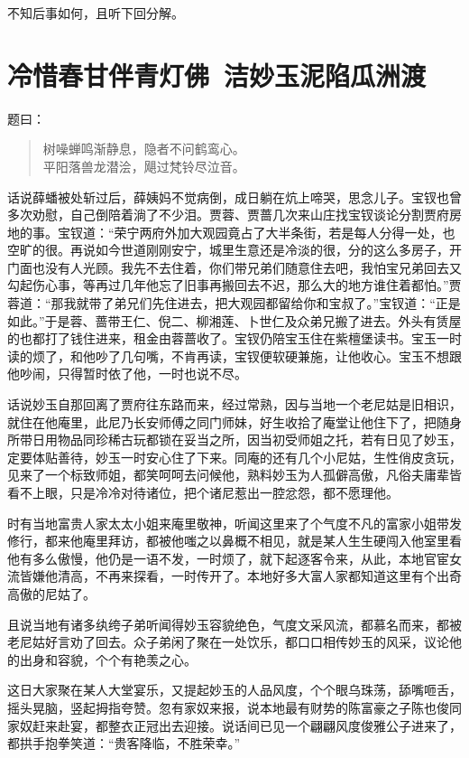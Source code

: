 \documentclass[12pt,oneside]{book}
\newenvironment{shici}{%
\begin{verse}%
\centering\large\hspace{12pt}}%
{\end{verse}}
\begin{document}
不知后事如何，且听下回分解。

 
\chapter{冷惜春甘伴青灯佛~洁妙玉泥陷瓜洲渡}
题曰：

\begin{shici}
树噪蝉鸣渐静息，隐者不问鹤鸾心。\\
平阳落兽龙潜浍，飓过梵铃尽泣音。
\end{shici}


话说薛蟠被处斩过后，薛姨妈不觉病倒，成日躺在炕上啼哭，思念儿子。宝钗也曾多次劝慰，自己倒陪着淌了不少泪。贾蓉、贾蔷几次来山庄找宝钗谈论分割贾府房地的事。宝钗道：“荣宁两府外加大观园竟占了大半条街，若是每人分得一处，也空旷的很。再说如今世道刚刚安宁，城里生意还是冷淡的很，分的这么多房子，开门面也没有人光顾。我先不去住着，你们带兄弟们随意住去吧，我怕宝兄弟回去又勾起伤心事，等再过几年他忘了旧事再搬回去不迟，那么大的地方谁住着都怕。”贾蓉道：“那我就带了弟兄们先住进去，把大观园都留给你和宝叔了。”宝钗道：“正是如此。”于是蓉、蔷带王仁、倪二、柳湘莲、卜世仁及众弟兄搬了进去。外头有赁屋的也都打了钱住进来，租金由蓉蔷收了。宝钗仍陪宝玉住在紫檀堡读书。宝玉一时读的烦了，和他吵了几句嘴，不肯再读，宝钗便软硬兼施，让他收心。宝玉不想跟他吵闹，只得暂时依了他，一时也说不尽。

话说妙玉自那回离了贾府往东路而来，经过常熟，因与当地一个老尼姑是旧相识，就住在他庵里，此尼乃长安师傅之同门师妹，好生收拾了庵堂让他住下了，把随身所带日用物品同珍稀古玩都锁在妥当之所，因当初受师姐之托，若有日见了妙玉，定要体贴善待，妙玉一时安心住了下来。同庵的还有几个小尼姑，生性俏皮贪玩，见来了一个标致师姐，都笑呵呵去问候他，熟料妙玉为人孤僻高傲，凡俗夫庸辈皆看不上眼，只是冷冷对待诸位，把个诸尼惹出一腔忿怨，都不愿理他。

时有当地富贵人家太太小姐来庵里敬神，听闻这里来了个气度不凡的富家小姐带发修行，都来他庵里拜访，都被他嗤之以鼻概不相见，就是某人生生硬闯入他室里看他有多么傲慢，他仍是一语不发，一时烦了，就下起逐客令来，从此，本地官宦女流皆嫌他清高，不再来探看，一时传开了。本地好多大富人家都知道这里有个出奇高傲的尼姑了。

且说当地有诸多纨绔子弟听闻得妙玉容貌绝色，气度文采风流，都慕名而来，都被老尼姑好言劝了回去。众子弟闲了聚在一处饮乐，都口口相传妙玉的风采，议论他的出身和容貌，个个有艳羡之心。

这日大家聚在某人大堂宴乐，又提起妙玉的人品风度，个个眼乌珠荡，舔嘴咂舌，摇头晃脑，竖起拇指夸赞。忽有家奴来报，说本地最有财势的陈富豪之子陈也俊同家奴赶来赴宴，都整衣正冠出去迎接。说话间已见一个翩翩风度俊雅公子进来了，都拱手抱拳笑道：“贵客降临，不胜荣幸。”
\end{document}
